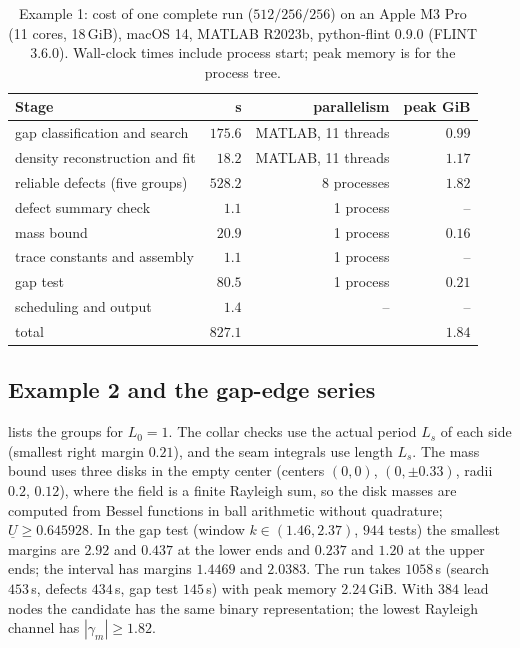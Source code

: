 \begin{table}[tbhp]
\caption{Example 1: cost of one complete run ($512/256/256$) on an Apple M3 Pro
(11 cores, 18\,GiB), macOS 14, MATLAB R2023b, python-flint 0.9.0 (FLINT 3.6.0).
Wall-clock times include process start; peak memory is for the process tree.}
\label{sm:tab-cost}
\centering\small
\begin{tabular}{lrrr}
\toprule
Stage & s & parallelism & peak GiB\\
\midrule
gap classification and search & $175.6$ & MATLAB, 11 threads & $0.99$\\
density reconstruction and fit & $18.2$ & MATLAB, 11 threads & $1.17$\\
reliable defects (five groups) & $528.2$ & 8 processes & $1.82$\\
defect summary check & $1.1$ & 1 process & --\\
mass bound & $20.9$ & 1 process & $0.16$\\
trace constants and assembly & $1.1$ & 1 process & --\\
gap test & $80.5$ & 1 process & $0.21$\\
scheduling and output & $1.4$ & -- & --\\
\midrule
total & $827.1$ & & $1.84$\\
\bottomrule
\end{tabular}
\end{table}

\subsection{Example 2 and the gap-edge series}
 lists the groups for $L_0=1$. The collar checks use the actual
period $L_s$ of each side (smallest right margin $0.21$), and the seam integrals use
length $L_s$. The mass bound uses three disks in the empty center (centers $(0,0)$,
$(0,\pm0.33)$, radii $0.2$, $0.12$), where the field is a finite Rayleigh sum, so the
disk masses are computed from Bessel functions in ball arithmetic without
quadrature; $\underline U\ge0.645928$. In the gap test (window $k\in(1.46,2.37)$,
$944$ tests) the smallest margins are $2.92$ and $0.437$ at the lower ends and
$0.237$ and $1.20$ at the upper ends; the interval has margins $1.4469$ and $2.0383$.
The run takes $1058$\,s (search $453$\,s, defects $434$\,s, gap test $145$\,s) with
peak memory $2.24$\,GiB. With $384$ lead nodes the candidate has the same binary
representation; the lowest Rayleigh channel has $|\gamma_m|\ge1.82$.

